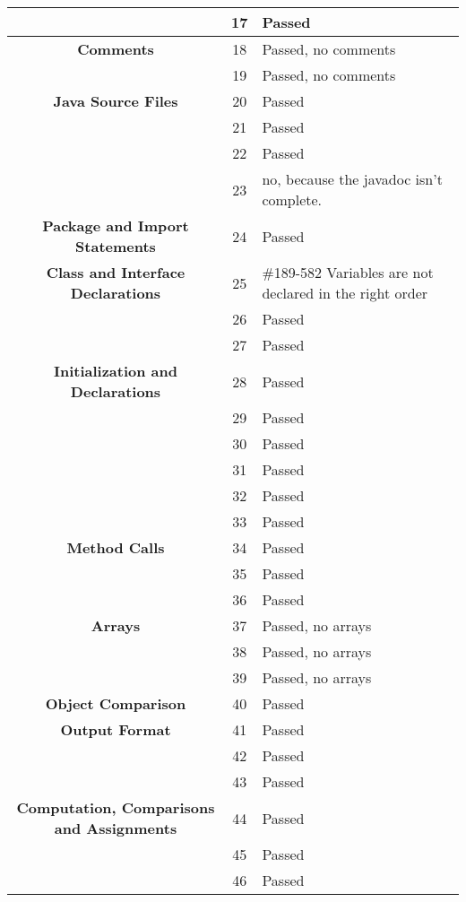 \documentclass[11pt, a4paper,titlepage]{article}
\begin{document}
\newpage
\begin{tabularx}{\textwidth}{| c |c |X |}
	\hline  & 17 & Passed \\
	\hline \textbf{Comments} & 18 & Passed, no comments \\
	\hline  & 19 & Passed, no comments \\
	\hline \textbf{Java Source Files} & 20 & Passed \\
	\hline  & 21 & Passed \\
	\hline  & 22 & Passed \\
	\hline  & 23 & no, because the javadoc isn't complete. \\
	\hline \textbf{Package and Import Statements} & 24 & Passed \\
	\hline \textbf{Class and Interface Declarations} & 25 & \#189-582 Variables are not declared in the right order \\
	\hline  & 26 & Passed \\
	\hline  & 27 & Passed \\
	\hline \textbf{Initialization and Declarations} & 28 & Passed \\
	\hline  & 29 & Passed \\
	\hline  & 30 & Passed \\
	\hline  & 31 & Passed \\
	\hline  & 32 & Passed \\
	\hline  & 33 & Passed \\
	\hline \textbf{Method Calls} & 34 & Passed \\
	\hline  & 35 & Passed \\
	\hline  & 36 & Passed \\
	\hline \textbf{Arrays} & 37 & Passed, no arrays \\
	\hline  & 38 & Passed, no arrays \\
	\hline  & 39 & Passed, no arrays \\
	\hline \textbf{Object Comparison} & 40 & Passed \\
	\hline \textbf{Output Format} & 41 & Passed \\
	\hline  & 42 & Passed \\
	\hline  & 43 & Passed \\
	\hline \textbf{Computation, Comparisons and Assignments} & 44 & Passed \\
	\hline  & 45 & Passed \\
	\hline  & 46 & Passed \\
	\hline
\end{tabularx}
\end{document}
